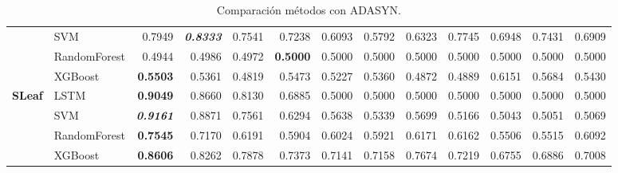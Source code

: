 \begin{table}[H]
\begin{adjustbox}{max width=12cm}
\begin{tabular}{|c|l|r|r|r|r|r|r|r|r|r|r|r|}
			                      & SVM          & 0.7949                   & \textit{\textbf{0.8333}} & 0.7541          & 0.7238                   & 0.6093          & 0.5792 & 0.6323          & 0.7745                   & 0.6948                   & 0.7431          & 0.6909          \\
			                      & RandomForest & 0.4944                   & 0.4986                   & 0.4972          & \textbf{0.5000}          & 0.5000          & 0.5000 & 0.5000          & 0.5000                   & 0.5000                   & 0.5000          & 0.5000          \\
			                      & XGBoost      & \textbf{0.5503}          & 0.5361                   & 0.4819          & 0.5473                   & 0.5227          & 0.5360 & 0.4872          & 0.4889                   & 0.6151                   & 0.5684          & 0.5430          \\
			\hline
			\textbf{SLeaf}        & LSTM         & \textbf{0.9049}          & 0.8660                   & 0.8130          & 0.6885                   & 0.5000          & 0.5000 & 0.5000          & 0.5000                   & 0.5000                   & 0.5000          & 0.5000          \\
			                      & SVM          & \textit{\textbf{0.9161}} & 0.8871                   & 0.7561          & 0.6294                   & 0.5638          & 0.5339 & 0.5699          & 0.5166                   & 0.5043                   & 0.5051          & 0.5069          \\
			                      & RandomForest & \textbf{0.7545}          & 0.7170                   & 0.6191          & 0.5904                   & 0.6024          & 0.5921 & 0.6171          & 0.6162                   & 0.5506                   & 0.5515          & 0.6092          \\
			                      & XGBoost      & \textbf{0.8606}          & 0.8262                   & 0.7878          & 0.7373                   & 0.7141          & 0.7158 & 0.7674          & 0.7219                   & 0.6755                   & 0.6886          & 0.7008          \\
			\hline
		\end{tabular}
	\end{adjustbox}
	\caption{Comparación métodos con ADASYN.}
	\label{tab:all_comp_adasyn}
\end{table}


